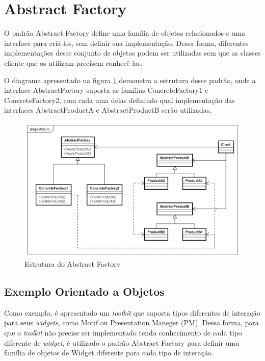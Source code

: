 \section{Abstract Factory}

O padrão Abstract Factory define uma família 
de objetos relacionados e uma interface para 
criá-los, sem definir sua implementação. Dessa 
forma, diferentes implementações desse 
conjunto de objetos podem ser utilizadas 
sem que as classes cliente que os utilizam 
precisem conhecê-las.\cite{gamma:1995}

O diagrama apresentado na figura \ref{abfactory_struct} 
demonstra a estrutura desse padrão, onde a 
interface AbstractFactory suporta as famílias 
ConcreteFactory1 e ConcreteFactory2, com cada uma 
delas definindo qual implementação das interfaces 
AbstractProductA e AbstractProductB serão 
utilizadas.

\begin{figure}[htb]
	\caption{\label{abfactory_struct}Estrutura do Abstract Factory}
	\begin{center}
	    \includegraphics[scale=0.5]{5_padroes-contexto-funcional/5.1_criacionais/5.1.2_abstract-factory/abstractfactory_estrutura.png}
	\end{center}
\end{figure}

\subsection*{Exemplo Orientado a Objetos}

Como exemplo, é apresentado um \textit{toolkit} 
que suporta tipos diferentes de interação para 
seus \textit{widgets}, como Motif ou Presentation 
Maneger (PM). Dessa forma, para que o \textit{toolkit} 
não precise ser implementado tendo conhecimento 
de cada tipo diferente de \textit{widget}, é 
utilizado o padrão Abstract Factory para 
definir uma família de objetos de Widget 
diferente para cada tipo de interação. 

